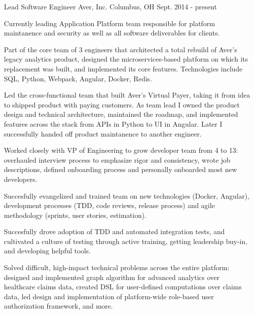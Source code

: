 

\begin{cventries}

  \cventry
    {Lead Software Engineer} %
    {Aver, Inc.} %
    {Columbus, OH} %
    {Sept. 2014 - present} %
    {
      \begin{cvitems} %
        \item {Currently leading Application Platform team responsible for platform maintanence and security as well as all software deliverables for clients.}
        \item {Part of the core team of 3 engineers that architected a total rebuild of Aver's legacy analytics product, designed the microservices-based platform on which its replacement was built, and implemented its core features. Technologies include SQL, Python, Webpack, Angular, Docker, Redis.}
        \item {Led the cross-functional team that built Aver's Virtual Payer, taking it from idea to shipped product with paying customers. As team lead I owned the product design and technical architecture, maintained the roadmap, and implemented features across the stack from APIs in Python to UI in Angular. Later I successfully handed off product maintanence to another engineer.}
        \item {Worked closely with VP of Engineering to grow developer team from 4 to 13: overhauled interview process to emphasize rigor and consistency, wrote job descriptions, defined onboarding process and personally onboarded most new developers.}
        \item {Succesfully evangelized and trained team on new technologies (Docker, Angular), development processes (TDD, code reviews, release process) and agile methodology (sprints, user stories, estimation). }
        \item {Succesfully drove adoption of TDD and automated integration tests, and cultivated a culture of testing through active training, getting leadership buy-in, and developing helpful tools. }
        \item {Solved difficult, high-impact technical problems across the entire platform: designed and implemented graph algorithm for advanced analytics over healthcare claims data, created DSL for user-defined computations over claims data, led design and implementation of platform-wide role-based user authorization framework, and more.}
      \end{cvitems}
    }


\end{cventries}
